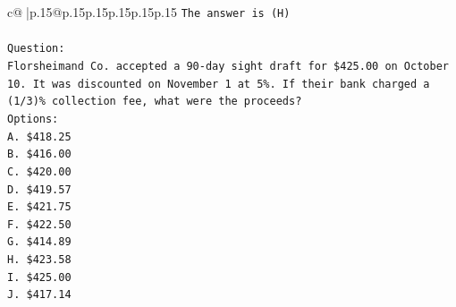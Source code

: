 \documentclass{article}
\begin{document}
{\begin{supertabular}{c@{$\;$}|p{.15\linewidth}@{}p{.15\linewidth}p{.15\linewidth}p{.15\linewidth}p{.15\linewidth}p{.15\linewidth}}
{{{\texttt{The answer is (H)} \\
\\ 
\texttt{Question:} \\
\texttt{Florsheimand Co. accepted a 90{-}day sight draft for \$425.00 on October 10. It was discounted on November 1 at 5\%. If their bank charged a (1/3)\% collection fee, what were the proceeds?} \\
\texttt{Options:} \\
\texttt{A. \$418.25} \\
\texttt{B. \$416.00} \\
\texttt{C. \$420.00} \\
\texttt{D. \$419.57} \\
\texttt{E. \$421.75} \\
\texttt{F. \$422.50} \\
\texttt{G. \$414.89} \\
\texttt{H. \$423.58} \\
\texttt{I. \$425.00} \\
\texttt{J. \$417.14} \\
            }
        }
    }
     \\ \\


\end{supertabular}}
\end{document}

